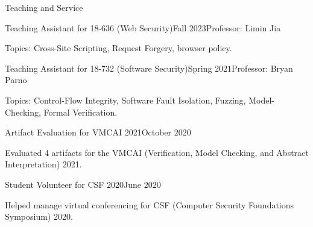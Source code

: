 \documentclass{resume} %
\begin{document}
\begin{rSection}{Teaching and Service}
  \begin{rSubsection}{Teaching Assistant for 18-636 (Web
      Security)}{Fall $2023$}{Professor: Limin Jia}{}
  \item Topics: Cross-Site Scripting, Request Forgery, browser policy.
  \end{rSubsection}

  \begin{rSubsection}{Teaching Assistant for 18-732 (Software
      Security)}{Spring $2021$}{Professor: Bryan Parno}{}
  \item Topics: Control-Flow Integrity, Software Fault Isolation,
    Fuzzing, Model-Checking, Formal Verification.
  \end{rSubsection}

  \begin{rSubsection}{Artifact Evaluation for VMCAI 2021}{October $2020$}
    {}{}
  \item Evaluated 4 artifacts for the VMCAI (Verification, Model
    Checking, and Abstract Interpretation) 2021.
  \end{rSubsection}

  \begin{rSubsection}{Student Volunteer for CSF 2020}{June $2020$}
    {}{}
  \item Helped manage virtual conferencing for CSF
    (Computer Security Foundations Symposium) 2020.
  \end{rSubsection}
\end{rSection}
\end{document}
